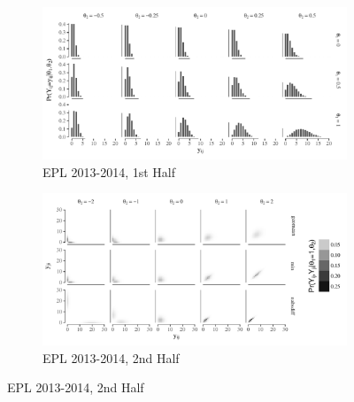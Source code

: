 \documentclass[12pt,a4paper,twoside,openany]{book}
\makeatletter
\def\maxwidth{ %
  \ifdim\Gin@nat@width>\linewidth
    \linewidth
  \else
    \Gin@nat@width
  \fi
}
\newenvironment{knitrout}{}{} %
\makeatother
\begin{document}
\begin{figure}[H] %

\hspace*{\fill}
\begin{subfigure}{0.40\textwidth}
\begin{knitrout}
\color{fgcolor}

{\centering \includegraphics[width=\maxwidth]{figure/unnamed-chunk-3-1} 

}



\end{knitrout}
\caption{EPL 2013-2014, 1st Half}
\end{subfigure}\hspace*{\fill}
\begin{subfigure}{0.40\textwidth}
\begin{knitrout}
\color{fgcolor}

{\centering \includegraphics[width=\maxwidth]{figure/unnamed-chunk-4-1} 

}



\end{knitrout}
\caption{EPL 2013-2014, 2nd Half} 
\end{subfigure}
\hspace*{\fill}


\end{figure}
\end{document}
